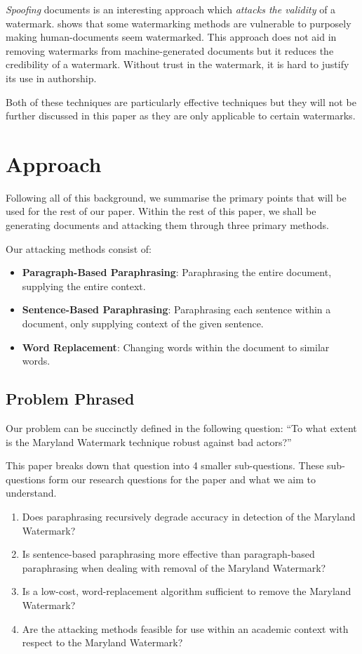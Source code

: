 \documentclass{l4proj}
\theoremstyle{definition}
\begin{document}
        \emph{Spoofing} documents is an interesting approach which \emph{attacks the validity} of a watermark. \citet{sadasivan2023aigenerated} shows that some watermarking methods are vulnerable to purposely making human-documents seem watermarked. This approach does not aid in removing watermarks from machine-generated documents but it reduces the credibility of a watermark. Without trust in the watermark, it is hard to justify its use in authorship.

        Both of these techniques are particularly effective techniques but they will not be further discussed in this paper as they are only applicable to certain watermarks. 

\section{Approach}  
    Following all of this background, we summarise the primary points that will be used for the rest of our paper. Within the rest of this paper, we shall be generating documents and attacking them through three primary methods.

    Our attacking methods consist of:
    \begin{itemize}
        \setlength\itemsep{0.5em}
        \item \textbf{Paragraph-Based Paraphrasing}: Paraphrasing the entire document, supplying the entire context. 
        \item \textbf{Sentence-Based Paraphrasing}: Paraphrasing each sentence within a document, only supplying context of the given sentence.
        \item \textbf{Word Replacement}: Changing words within the document to similar words.
    \end{itemize}

    \subsection{Problem Phrased}
        Our problem can be succinctly defined in the following question: ``To what extent is the Maryland Watermark technique robust against bad actors?''

        This paper breaks down that question into 4 smaller sub-questions. These sub-questions form our research questions for the paper and what we aim to understand.
        \begin{enumerate}[label={\textbf{RQ\arabic*}:}, leftmargin=4em]
            \label{sec:research-questions}
            \item Does paraphrasing recursively degrade accuracy in detection of the Maryland Watermark?
            \item Is sentence-based paraphrasing more effective than paragraph-based paraphrasing when dealing with removal of the Maryland Watermark?
            \item Is a low-cost, word-replacement algorithm sufficient to remove the Maryland Watermark? 
            \item Are the attacking methods feasible for use within an academic context with respect to the Maryland Watermark?
        \end{enumerate}
\end{document}
